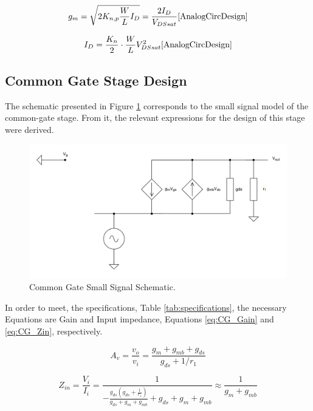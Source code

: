 \begin{equation}
    g_m =\sqrt{2K_{n,p}\frac{W}{L}I_D}= \frac{2I_D}{V_{DSsat}}
    \text{\cite{AnalogCircDesign}}
    \label{eq:gm_eq}
\end{equation}

\begin{equation}
    I_D=\frac{K_n}{2}\cdot\frac{W}{L}V_{DSsat}^2
    \text{\cite{AnalogCircDesign}}
    \label{eq:ID_eq}
\end{equation}

\subsection{Common Gate Stage Design}

The schematic presented in Figure \ref{fig:CG_SmallSignal} corresponds to the small signal model of the common-gate stage. From it, the relevant expressions for the design of this stage were derived. 

\begin{figure}[H]
    \centering
    \includegraphics[width=1\textwidth]{Images/CG_SmallSignal.png}
    \caption{Common Gate Small Signal Schematic.}
    \label{fig:CG_SmallSignal}
\end{figure}

In order to meet, the specifications, Table \ref{tab:specifications}, the necessary Equations are Gain and Input impedance, Equations \ref{eq:CG_Gain} and \ref{eq:CG_Zin}, respectively.

\begin{equation}
    A_v = \frac{v_o}{v_i}=\frac{g_m+g_{mb}+g_{ds}}{g_{ds}+1/r_1}
    \label{eq:CG_Gain}
\end{equation}

\begin{equation}
    Z_{in} = \frac{V_i}{I_i}=\frac{1}{- \frac{g_{ds} \left(g_{ds} + \frac{1}{r_{1}}\right)}{g_{ds} + g_{m} + g_{mb}} + g_{ds} + g_{m} + g_{mb}}\approx\frac{1}{g_m+g_{mb}}
    \label{eq:CG_Zin}
\end{equation}

